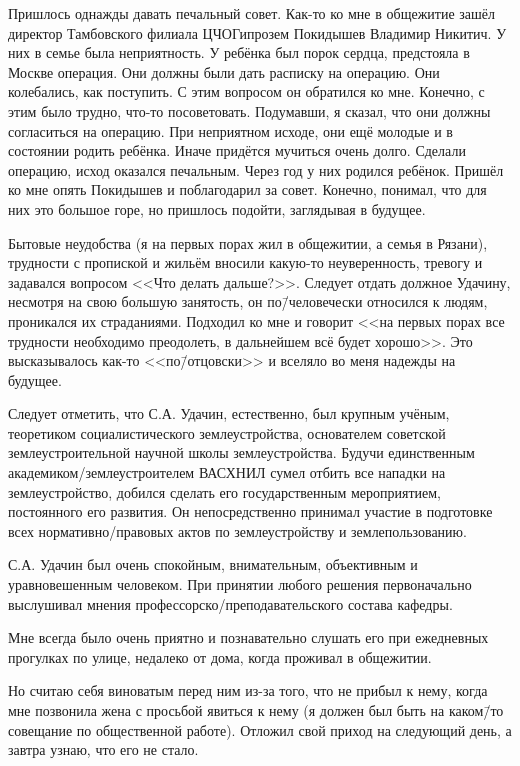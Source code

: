 Пришлось однажды давать печальный совет. Как-то ко мне в общежитие зашёл директор Тамбовского филиала ЦЧОГипрозем Покидышев Владимир Никитич. У них в семье была неприятность. У ребёнка был порок сердца, предстояла в Москве операция. Они должны были дать расписку на операцию. Они колебались, как поступить. С этим вопросом он обратился ко мне. Конечно, с этим было трудно, что-то посоветовать. Подумавши, я сказал, что они должны согласиться на операцию. При неприятном исходе, они ещё молодые и в состоянии родить ребёнка. Иначе придётся мучиться очень долго. Сделали операцию, исход оказался печальным. Через год у них родился ребёнок. Пришёл ко мне опять Покидышев и поблагодарил за совет. Конечно, понимал, что для них это большое горе, но пришлось подойти, заглядывая в будущее.

Бытовые неудобства (я на первых порах жил в общежитии, а семья в Рязани), трудности с пропиской и жильём вносили какую-то неуверенность, тревогу и задавался вопросом <<Что делать дальше?>>. Следует отдать должное Удачину, несмотря на свою большую занятость, он по\=/человечески относился к людям, проникался их страданиями. Подходил ко мне и говорит <<на первых порах все трудности необходимо преодолеть, в дальнейшем всё будет хорошо>>. Это высказывалось как-то <<по\=/отцовски>> и вселяло во меня надежды на будущее. 

Следует отметить, что С.А. Удачин, естественно, был крупным учёным, теоретиком социалистического землеустройства, основателем советской землеустроительной научной школы землеустройства. Будучи единственным академиком\-/землеустроителем ВАСХНИЛ сумел отбить все нападки на землеустройство, добился сделать его государственным мероприятием, постоянного его развития. Он непосредственно принимал участие в подготовке всех нормативно\-/правовых актов по землеустройству и землепользованию. 

С.А. Удачин был очень спокойным, внимательным, объективным и уравновешенным человеком. При принятии любого решения первоначально выслушивал мнения профессорско\-/преподавательского состава кафедры. 

Мне всегда было очень приятно и познавательно слушать его при ежедневных прогулках по улице, недалеко от дома, когда проживал в общежитии.

Но считаю себя виноватым перед ним из-за того, что не прибыл к нему, когда мне позвонила жена с просьбой явиться к нему (я должен был быть на каком\=/то совещание по общественной работе). Отложил свой приход на следующий день, а завтра узнаю, что его не стало.

